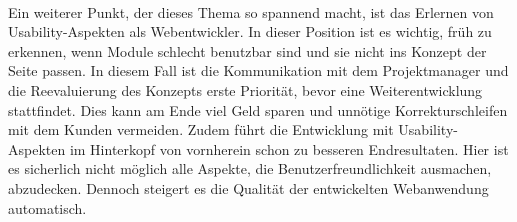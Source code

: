\\
Ein weiterer Punkt, der dieses Thema so spannend macht, ist das Erlernen von Usability-Aspekten als Webentwickler. In dieser Position ist es wichtig, früh zu erkennen, wenn Module schlecht benutzbar sind und sie nicht ins Konzept der Seite passen. In diesem Fall ist die Kommunikation mit dem Projektmanager und die Reevaluierung des Konzepts erste Priorität, bevor eine Weiterentwicklung stattfindet. Dies kann am Ende viel Geld sparen und unnötige Korrekturschleifen mit dem Kunden vermeiden. Zudem führt die Entwicklung mit Usability-Aspekten im Hinterkopf von vornherein schon zu besseren Endresultaten. Hier ist es sicherlich nicht möglich alle Aspekte, die Benutzerfreundlichkeit ausmachen, abzudecken. Dennoch steigert es die Qualität der entwickelten Webanwendung automatisch.